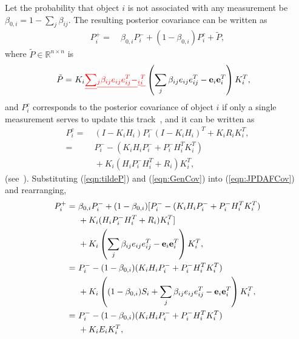 \documentclass[letterpaper, 10pt, conference]{ieeeconf}
\newcommand{\parenth}[1]{\ensuremath{\left( #1 \right)}}
\newcommand{\refeqn}[1]{(\ref{eqn:#1})}
\renewcommand{\Re}{\ensuremath{\mathbb{R}}}
\providecommand{\DIFdel}[1]{{\protect\color{red}\sout{#1}}}                      %
\providecommand{\DIFaddbegin}{} %
\providecommand{\DIFaddend}{} %
\providecommand{\DIFdelbegin}{} %
\providecommand{\DIFdelend}{} %
\begin{document}
Let the probability that object $i$ is not associated with any measurement be $\beta_{0,i}=1-{\sum\limits_{j} \beta_{ij}}$.
The resulting posterior covariance can be written as
\begin{align}
\label{eqn:JPDAFCov}
P^+_{i}=&\ \beta_{0,i}P^-_{i}+(1-\beta_{0,i})P_i^c+\tilde P,
\end{align}
where $\tilde P\in\Re^{n\times n}$ is
\begin{align}
\tilde P=&\ K_i\DIFdelbegin %
\DIFdel{\sum}%
\DIFdel{_{j} \beta_{ij}e_{ij}e_{ij}^T-}%
\DIFdel{_{i}}%
\DIFdel{_{i}^T}%
\DIFdelend \DIFaddbegin \parenth{{\sum\limits_{j} \beta_{ij}e_{ij}e_{ij}^T-{\bf{e}}_{i}}{\bf{e}}_{i}^T}\DIFaddend K_{i}^T,\label{eqn:tildeP}
\end{align}
and $P_i^c$ corresponds to the posterior covariance of object $i$ if only a single measurement serves to update this track~\cite{TrackDataAssoc}, and it can be written as
\begin{align}
P^c_i=&\ (I-K_iH_i)P^-_i(I-K_iH_i)^T+K_iR_iK_i^T,\nonumber
\\
=&\ P^-_i-(K_iH_iP^-_i+P^-_iH_i^TK_i^T)\nonumber
\\
&\ +K_i(H_iP^-_iH_i^T+R_i)K_i^T,
\label{eqn:GenCov}
\end{align}
(see~\cite{OptEst1}).
Substituting \refeqn{tildeP} and \refeqn{GenCov} into \refeqn{JPDAFCov} and rearranging,
\begin{align}
P^+_{i}=&\ \beta_{0,i}P^-_{i}+(1-\beta_{0,i})[P^-_i-(K_iH_iP^-_i+P^-_iH_i^TK_i^T)\nonumber
\\
&\ +K_i(H_iP^-_iH_i^T+R_i)K_i^T]\nonumber
\\
&\ +K_i\left({\sum\limits_{j} \beta_{ij}e_{ij}e_{ij}^T-{\bf{e}}_{i}}{\bf{e}}_{i}^T\right)K_{i}^T,\nonumber
\\
=&\ P^-_{i}-(1-\beta_{0,i})(K_iH_iP^-_i+P^-_iH_i^TK_i^T)\nonumber
\\
&\ +K_i\left((1-\beta_{0,i})S_i+{\sum\limits_{j} \beta_{ij}e_{ij}e_{ij}^T-{\bf{e}}_{i}}{\bf{e}}_{i}^T\right)K_i^T,\nonumber
\\
=&\ P^-_{i}-(1-\beta_{0,i})(K_iH_iP^-_i+P^-_iH_i^TK_i^T)\nonumber
\\
&\ +K_iE_iK_i^T,\label{eqn:CovExpanded}
\end{align}
\end{document}
